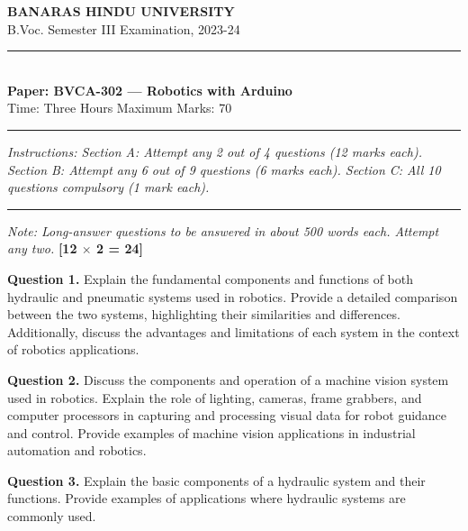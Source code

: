 \documentclass[11pt,a4paper]{article}
\begin{document}
\begin{center}
  {\large\bfseries BANARAS HINDU UNIVERSITY}\\[2pt]
  {\normalsize B.Voc. Semester III Examination, 2023-24}\\[6pt]
  \rule{0.8\linewidth}{0.5pt}\\[6pt]
  {\large\bfseries Paper: BVCA-302 --- Robotics with Arduino}\\[4pt]
  {\normalsize Time: Three Hours \hfill Maximum Marks: 70}
\end{center}

\rule{\linewidth}{0.4pt}

\smallskip



\noindent   \textit{Instructions: Section A: Attempt any 2 out of 4 questions (12 marks each). Section B: Attempt any 6 out of 9 questions (6 marks each). Section C: All 10 questions compulsory (1 mark each).}

\bigskip

\bigskip


\rule{\linewidth}{0.4pt}\smallskip




\noindent   \textit{Note: Long-answer questions to be answered in about 500 words each. Attempt any two.} \hfill   \textbf{[12 $ \times$ 2 = 24]}

\medskip


\noindent   \textbf{Question 1.} Explain the fundamental components and functions of both hydraulic and pneumatic systems used in robotics. Provide a detailed comparison between the two systems, highlighting their similarities and differences. Additionally, discuss the advantages and limitations of each system in the context of robotics applications.

\medskip


\noindent   \textbf{Question 2.} Discuss the components and operation of a machine vision system used in robotics. Explain the role of lighting, cameras, frame grabbers, and computer processors in capturing and processing visual data for robot guidance and control. Provide examples of machine vision applications in industrial automation and robotics.

\medskip


\noindent   \textbf{Question 3.} Explain the basic components of a hydraulic system and their functions. Provide examples of applications where hydraulic systems are commonly used.
\end{document}
